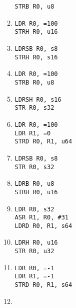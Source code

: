 \documentclass{article}
\begin{document}
\begin{enumerate}
\begin{multicols}{2}
\begin{enumerate}
                \texttt{STRB R0, u8}    \\
            \item
                \texttt{LDR R0, =100}   \\
                \texttt{STRH R0, u16}   \\
            \item
                \texttt{LDRSB R0, s8}   \\
                \texttt{STRH R0, s16}   \\
            \item
                \texttt{LDR R0, =100}   \\
                \texttt{STRB R0, u8}    \\
            \item
                \texttt{LDRSH R0, s16}  \\
                \texttt{STR R0, s32}    \\
            \item
                \texttt{LDR R0, =100}   \\
                \texttt{LDR R1, =0}     \\
                \texttt{STRD R0, R1, u64} \\
            \item
                \texttt{LDRSB R0, s8}   \\
                \texttt{STR R0, s32}    \\
            \item
                \texttt{LDRB R0, u8}    \\
                \texttt{STRH R0, u16}   \\
            \item
                \texttt{LDR R0, s32}    \\
                \texttt{ASR R1, R0, \#31}\\
                \texttt{LDRD R0, R1, s64}   \\
            \item
                \texttt{LDRH R0, u16}   \\
                \texttt{STR R0, u32}    \\
            \item
                \texttt{LDR R0, =-1}    \\
                \texttt{LDR R1, =-1}    \\
                \texttt{STRD R0, R1, s64}   \\
            \item

\end{enumerate}
\end{multicols}
\end{enumerate}
\end{document}
